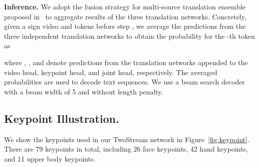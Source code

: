 \documentclass{article}
\begin{document}
\textbf{Inference.} We adopt the fusion strategy for multi-source translation ensemble proposed in~\cite{firat2016zero} to aggregate results of the three translation networks. Concretely, given a sign video  and tokens  before step , we average the predictions from the three independent translation networks to obtain the probability for the -th token as

where , , and  denote predictions from the translation networks appended to the video head, keypoint head, and joint head, respectively. The averaged probabilities are used to decode text sequences. We use a beam search decoder with a beam width of 5 and without length penalty.



\subsection{Keypoint Illustration.} We show the keypoints used in our TwoStream network in Figure~\ref{fig:keypoint}. There are 79 keypoints in total, including 26 face keypoints, 42 hand keypoints, and 11 upper body keypoints.
\end{document}
